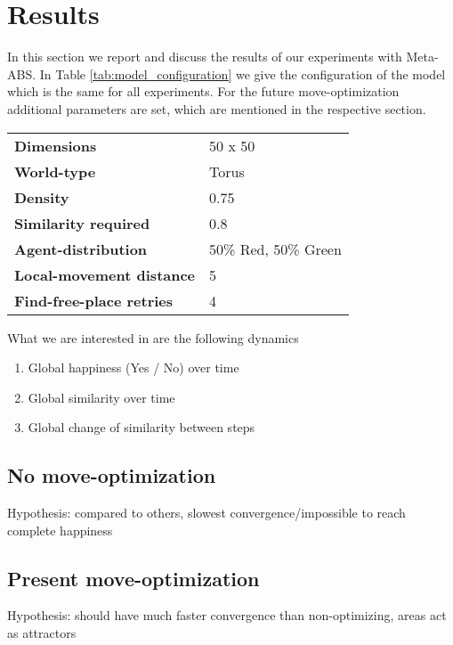 \section{Results}
In this section we report and discuss the results of our experiments with Meta-ABS. In Table \ref{tab:model_configuration} we give the configuration of the model which is the same for all experiments. For the future move-optimization additional parameters are set, which are mentioned in the respective section.

\begin{table*}[t]
	\centering
	\caption{Model Configuration}
	\label{tab:model_configuration}
		\begin{tabular}{ l | l }
			\hline \hline
			\textbf{Dimensions}					& 50 x 50 \\  
			\textbf{World-type}					& Torus	\\ 
			\textbf{Density}					& 0.75	\\ 
			\textbf{Similarity required}		& 0.8	\\ 
			\textbf{Agent-distribution}			& 50\% Red, 50\% Green	\\ 
			\textbf{Local-movement distance}	& 5	\\ 
			\textbf{Find-free-place retries}	& 4	\\ 
			\hline \hline
		\end{tabular}
\end{table*}


What we are interested in are the following dynamics
\begin{enumerate}
	\item Global happiness (Yes / No) over time
	\item Global similarity over time
	\item Global change of similarity between steps
\end{enumerate}

\subsection{No move-optimization}
Hypothesis: compared to others, slowest convergence/impossible to reach complete happiness
	
\subsection{Present move-optimization}
Hypothesis: should have much faster convergence than non-optimizing, areas act as attractors
	

